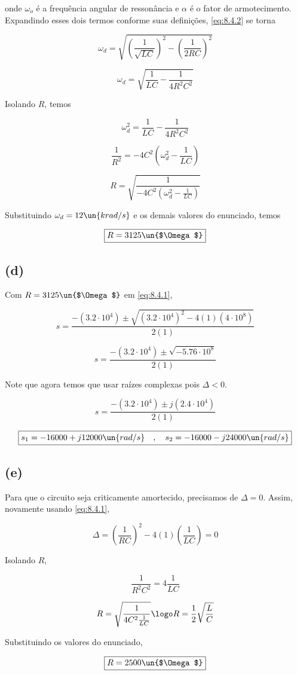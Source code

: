 onde $\omega_o$ é a frequência angular de ressonância e $\alpha$ é o fator de armotecimento. Expandindo esses dois termos conforme suas definições, 
\eqref{eq:8.4.2} se torna  

\[ \omega_d = \sqrt{\left(\frac{1}{\sqrt{LC}}\right)^2 -  \left(\frac{1}{2RC}\right)^2} \]

\[ \omega_d = \sqrt{\frac{1}{LC} -  \frac{1}{4R^2C^2}} \]

Isolando $R$, temos   

\[ \omega_d^2 = \frac{1}{LC} -  \frac{1}{4R^2C^2} \]

\[ \frac{1}{R^2} = - 4C^2\left(\omega_d^2 - \frac{1}{LC}\right)\]

\[ R = \sqrt{\frac{1}{- 4C^2\left(\omega_d^2 - \frac{1}{LC}\right)}} \]

Substituindo $\omega_d = 12 \un{krad/s}$ e os demais valores do enunciado, temos  

\[ \boxed{R = 3125 \un{$\Omega$} }  \]

\subsection*{(d)}

Com $R = 3125 \un{$\Omega$}$ em \eqref{eq:8.4.1}, 

\[ s = \frac{-(3.2 \cdot 10^4) \pm \sqrt{(3.2 \cdot 10^4)^2 - 4(1)(4 \cdot 10^8)}}{2(1)} \]

\[ s = \frac{-(3.2 \cdot 10^4) \pm \sqrt{-5.76 \cdot 10^8}}{2(1)} \]

Note que agora temos que usar raízes complexas pois $\Delta < 0$.

\[ s = \frac{-(3.2 \cdot 10^4) \pm j(2.4 \cdot 10^4)}{2(1)} \]

\[ \boxed{s_1 = - 16000 + j12000\un{rad/s} \quad , \quad s_2 = - 16000 - j24000 \un{rad/s} }  \]

\subsection*{(e)}

Para que o circuito seja criticamente amortecido, precisamos de $\Delta = 0$. Assim, novamente usando \eqref{eq:8.4.1},  

\[ \Delta = \left(\frac{1}{RC}\right)^2 - 4(1)\left(\frac{1}{LC}\right) = 0 \]

Isolando $R$,

\[ \frac{1}{R^2C^2} = 4\frac{1}{LC} \]

\[R = \sqrt{\frac{1}{4C^2\frac{1}{LC}}} \logo R = \frac{1}{2}\sqrt{\frac{L}{C}} \]

Substituindo os valores do enunciado,  

\[ \boxed{R = 2500 \un{$\Omega$} }  \]










